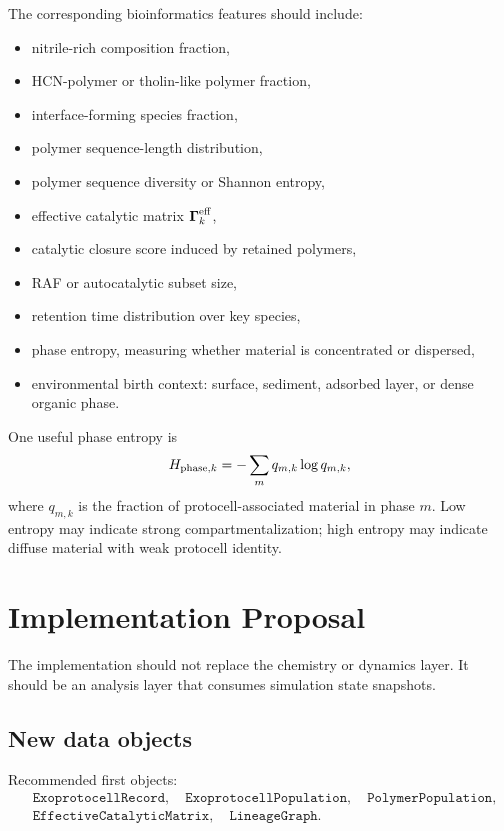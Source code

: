 \documentclass[11pt]{article}
\begin{document}
The corresponding bioinformatics features should include:
\begin{itemize}
\item nitrile-rich composition fraction,
\item HCN-polymer or tholin-like polymer fraction,
\item interface-forming species fraction,
\item polymer sequence-length distribution,
\item polymer sequence diversity or Shannon entropy,
\item effective catalytic matrix $\boldsymbol{\Gamma}^{\rm eff}_k$,
\item catalytic closure score induced by retained polymers,
\item RAF or autocatalytic subset size,
\item retention time distribution over key species,
\item phase entropy, measuring whether material is concentrated or dispersed,
\item environmental birth context: surface, sediment, adsorbed layer, or dense organic phase.
\end{itemize}

One useful phase entropy is
\begin{equation}
H_{{\rm phase},k}
=
-\sum_m q_{m,k}\log q_{m,k},
\end{equation}
where $q_{m,k}$ is the fraction of protocell-associated material in phase $m$. Low entropy may indicate strong compartmentalization; high entropy may indicate diffuse material with weak protocell identity.

\section{Implementation Proposal}

The implementation should not replace the chemistry or dynamics layer. It should be an analysis layer that consumes simulation state snapshots.

\subsection{New data objects}

Recommended first objects:
\begin{align}
&\texttt{ExoprotocellRecord},\quad
\texttt{ExoprotocellPopulation},\quad
\texttt{PolymerPopulation},
\nonumber\\
&\texttt{EffectiveCatalyticMatrix},\quad
\texttt{LineageGraph}.
\end{align}
\end{document}
